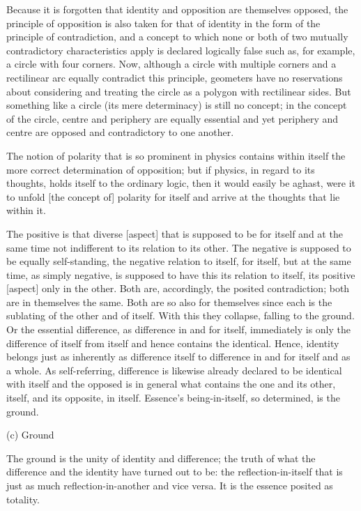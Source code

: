     Because it is forgotten that identity and opposition are themselves opposed,
    the principle of opposition is also taken for that of identity
    in the form of the principle of contradiction, and
    a concept to which none or both of two mutually
    contradictory characteristics apply is declared logically false
    such as, for example, a circle with four corners.
    Now, although a circle with multiple corners and a rectilinear arc
    equally contradict this principle, geometers have no reservations about
    considering and treating the circle as a polygon with rectilinear sides.
    But something like a circle (its mere determinacy) is still no concept;
    in the concept of the circle, centre and periphery are equally essential and
    yet periphery and centre are opposed and contradictory to one another.

    The notion of polarity that is so prominent in physics contains
    within itself the more correct determination of opposition;
    but if physics, in regard to its thoughts, holds itself to the ordinary logic,
    then it would easily be aghast, were it to unfold [the concept of]
    polarity for itself and arrive at the thoughts that lie within it.

The positive is that diverse [aspect]
that is supposed to be for itself and at the same time
not indifferent to its relation to its other.
The negative is supposed to be equally self-standing,
the negative relation to itself, for itself,
but at the same time, as simply negative,
is supposed to have this its relation to itself,
its positive [aspect] only in the other.
Both are, accordingly, the posited contradiction;
both are in themselves the same.
Both are so also for themselves since each is
the sublating of the other and of itself.
With this they collapse, falling to the ground.
Or the essential difference, as difference in and for itself,
immediately is only the difference of itself from itself
and hence contains the identical.
Hence, identity belongs just as inherently as difference itself
to difference in and for itself and as a whole.
As self-referring, difference is likewise already
declared to be identical with itself and
the opposed is in general what contains the one and its other,
itself, and its opposite, in itself.
Essence's being-in-itself, so determined, is the ground.

(c) Ground

The ground is the unity of identity and difference;
the truth of what the difference and the identity have turned out to be:
the reflection-in-itself that is just as much
reflection-in-another and vice versa.
It is the essence posited as totality.

